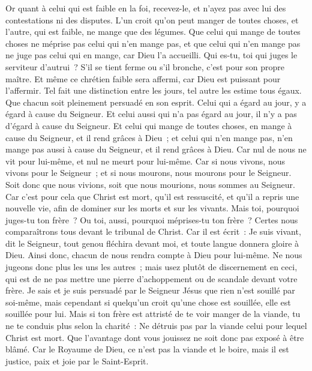 \begin{multicols}{2}
\VerseOne{}Or quant à celui qui est faible en la foi, recevez-le, et n'ayez pas avec lui des contestations ni des disputes.
L'un croit qu'on peut manger de toutes choses, et l'autre, qui est faible, ne mange que des légumes.
Que celui qui mange de toutes choses ne méprise pas celui qui n'en mange pas, et que celui qui n'en mange pas ne juge pas celui qui en mange, car Dieu l'a accueilli.
Qui es-tu, toi qui juges le serviteur d'autrui~? S'il se tient ferme ou s'il bronche, c'est pour son propre maître. Et même ce chrétien faible sera affermi, car Dieu est puissant pour l'affermir.
Tel fait une distinction entre les jours, tel autre les estime tous égaux. Que chacun soit pleinement persuadé en son esprit.
Celui qui a égard au jour, y a égard à cause du Seigneur. Et celui aussi qui n'a pas égard au jour, il n'y a pas d'égard à cause du Seigneur. Et celui qui mange de toutes choses, en mange à cause du Seigneur, et il rend grâces à Dieu~; et celui qui n'en mange pas, n'en mange pas aussi à cause du Seigneur, et il rend grâces à Dieu.
Car nul de nous ne vit pour lui-même, et nul ne meurt pour lui-même.
Car si nous vivons, nous vivons pour le Seigneur~; et si nous mourons, nous mourons pour le Seigneur. Soit donc que nous vivions, soit que nous mourions, nous sommes au Seigneur.
Car c'est pour cela que Christ est mort, qu'il est ressuscité, et qu'il a repris une nouvelle vie, afin de dominer sur les morts et sur les vivants.
Mais toi, pourquoi juges-tu ton frère~? Ou toi, aussi, pourquoi méprises-tu ton frère~? Certes nous comparaîtrons tous devant le tribunal de Christ.
Car il est écrit~: Je suis vivant, dit le Seigneur, tout genou fléchira devant moi, et toute langue donnera gloire à Dieu.
 Ainsi donc, chacun de nous rendra compte à Dieu pour lui-même.
Ne nous jugeons donc plus les uns les autres~; mais usez plutôt de discernement en ceci, qui est de ne pas mettre une pierre d'achoppement ou de scandale devant votre frère.
Je sais et je suis persuadé par le Seigneur Jésus que rien n'est souillé par soi-même, mais cependant si quelqu'un croit qu'une chose est souillée, elle est souillée pour lui.
Mais si ton frère est attristé de te voir manger de la viande, tu ne te conduis plus selon la charité~: Ne détruis pas par la viande celui pour lequel Christ est mort.
Que l'avantage dont vous jouissez ne soit donc pas exposé à être blâmé.
Car le Royaume de Dieu, ce n'est pas la viande et le boire, mais il est justice, paix et joie par le Saint-Esprit.

\end{multicols}
